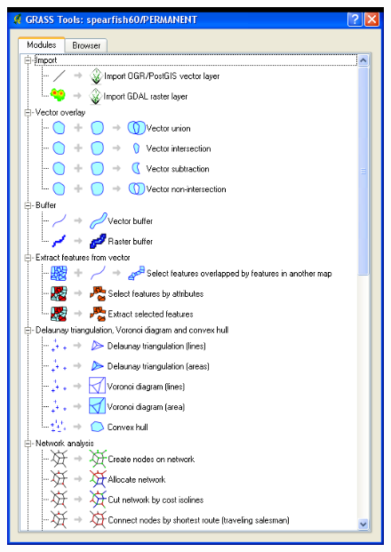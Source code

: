 \begin{figure}[htbp]
   \centering
   \includegraphics[scale=0.4]{qgis032.png}
   \caption{}
   \label{fig:qgis032}
\end{figure}

